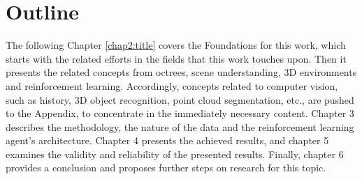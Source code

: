 
\section{Outline}\label{chap:1:outline}
The following Chapter \ref{chap2:title} covers the Foundations for this work, which starts with the related efforts in the fields that this work touches upon. Then it presents the related concepts from octrees, scene understanding, 3D environments and reinforcement learning. Accordingly, concepts related to computer vision, such as history, 3D object recognition, point cloud segmentation, etc., are pushed to the Appendix, to concentrate in the immediately necessary content. Chapter 3 describes the methodology, the nature of the data and the reinforcement learning agent's architecture. Chapter 4 presents the achieved results, and chapter 5 examines the validity and reliability of the presented results. Finally, chapter 6 provides a conclusion and proposes further steps on research for this topic.


        
        
